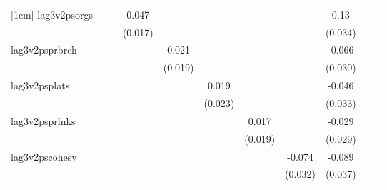 \begin{table}[htbp]
\begin{tabular}{l*{10}{c}}
[1em]
lag3v2psorgs        &                     &                     &       0.047\sym{**} &                     &                     &                     &                     &        0.13\sym{***}&                     &                     \\
                    &                     &                     &     (0.017)         &                     &                     &                     &                     &     (0.034)         &                     &                     \\
[1em]
lag3v2psprbrch      &                     &                     &                     &       0.021         &                     &                     &                     &      -0.066\sym{*}  &                     &                     \\
                    &                     &                     &                     &     (0.019)         &                     &                     &                     &     (0.030)         &                     &                     \\
[1em]
lag3v2psplats       &                     &                     &                     &                     &       0.019         &                     &                     &      -0.046         &                     &                     \\
                    &                     &                     &                     &                     &     (0.023)         &                     &                     &     (0.033)         &                     &                     \\
[1em]
lag3v2psprlnks      &                     &                     &                     &                     &                     &       0.017         &                     &      -0.029         &                     &                     \\
                    &                     &                     &                     &                     &                     &     (0.019)         &                     &     (0.029)         &                     &                     \\
[1em]
lag3v2pscohesv      &                     &                     &                     &                     &                     &                     &      -0.074\sym{*}  &      -0.089\sym{*}  &                     &                     \\
                    &                     &                     &                     &                     &                     &                     &     (0.032)         &     (0.037)         &                     &                     \\

\end{tabular}
\end{table}
